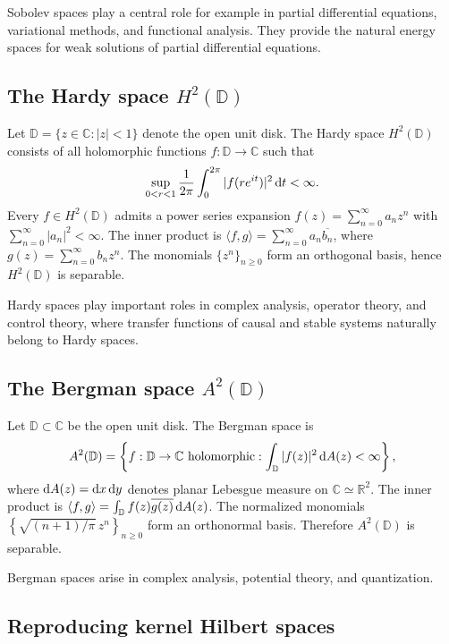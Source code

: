 \documentclass[12pt]{amsart}
\newcommand{\D}[1]{\mbox{\rm #1}}
\newcommand{\dd}{\D{d}}
\numberwithin{equation}{section}
\begin{document}
Sobolev spaces play a central role for example in partial differential equations, variational methods, and functional analysis.  They provide the natural energy spaces for weak solutions of partial differential equations.

\subsection{The Hardy space \texorpdfstring{$H^2(\mathbb{D})$}{H2(D)}}

Let $\mathbb{D} = \{z\in\mathbb{C}:|z|<1\}$ denote the open unit disk. The Hardy space $H^2(\mathbb{D})$ consists of all holomorphic functions $f:\mathbb{D}\to\mathbb{C}$ such that
\[
    \sup_{0<r<1} \frac{1}{2\pi}\int_0^{2\pi} |f(re^{it})|^2\,\dd t < \infty.
\]
Every $f\in H^2(\mathbb{D})$ admits a power series expansion $f(z) = \sum_{n=0}^\infty a_n z^n$  with $\sum_{n=0}^\infty |a_n|^2<\infty$. The inner product is $\langle f,g\rangle = \sum_{n=0}^\infty a_n\overline{b_n}$,  where $g(z)=\sum_{n=0}^\infty b_n z^n$. The monomials $\{z^n\}_{n\ge0}$ form an orthogonal basis, hence $H^2(\mathbb{D})$ is separable.

Hardy spaces play important roles in complex analysis, operator theory, and control theory, where transfer functions of causal and stable systems naturally belong to Hardy spaces.

\subsection{The Bergman space \texorpdfstring{$A^2(\mathbb{D})$}{A2(D)}}

Let $\mathbb{D}\subset\mathbb{C}$ be the open unit disk. The Bergman space is
\[
    A^2(\mathbb{D}) = \left\{ f:\mathbb{D}\to\mathbb{C} \text{ holomorphic} : \int_{\mathbb{D}}|f(z)|^2\,\dd A(z)<\infty \right\},
\]
where $\dd A(z)=\dd x\,\dd y$ denotes planar Lebesgue measure on $\mathbb{C}\simeq\mathbb{R}^2$. The inner product is $\langle f,g\rangle = \int_{\mathbb{D}} f(z)\overline{g(z)} \,\dd A(z)$.  The normalized monomials $\left\{ \sqrt{(n+1)/{\pi}}\,z^n \right\}_{n\ge0}$ form an orthonormal basis. Therefore $A^2(\mathbb{D})$ is separable.

Bergman spaces arise in complex analysis, potential theory, and quantization.

\subsection{Reproducing kernel Hilbert spaces}
\end{document}

